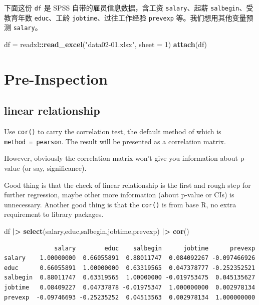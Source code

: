 \documentclass[
]{ctexart}
\newenvironment{Shaded}{\begin{snugshade}}{\end{snugshade}}
\newcommand{\AttributeTok}[1]{\textcolor[rgb]{0.13,0.29,0.53}{#1}}
\newcommand{\DecValTok}[1]{\textcolor[rgb]{0.00,0.00,0.81}{#1}}
\newcommand{\FunctionTok}[1]{\textcolor[rgb]{0.13,0.29,0.53}{\textbf{#1}}}
\newcommand{\NormalTok}[1]{#1}
\newcommand{\OtherTok}[1]{\textcolor[rgb]{0.56,0.35,0.01}{#1}}
\newcommand{\SpecialCharTok}[1]{\textcolor[rgb]{0.81,0.36,0.00}{\textbf{#1}}}
\newcommand{\StringTok}[1]{\textcolor[rgb]{0.31,0.60,0.02}{#1}}
\begin{document}
下面这份 \texttt{df} 是 SPSS 自带的雇员信息数据，含工资
\texttt{salary}、起薪 \texttt{salbegin}、受教育年数 \texttt{educ}、工龄
\texttt{jobtime}、过往工作经验 \texttt{prevexp} 等。我们想用其他变量预测
\texttt{salary}。

\begin{Shaded}
\begin{Highlighting}[]
\NormalTok{df }\OtherTok{=}\NormalTok{ readxl}\SpecialCharTok{::}\FunctionTok{read\_excel}\NormalTok{(}\StringTok{"data02{-}01.xlsx"}\NormalTok{, }\AttributeTok{sheet =} \DecValTok{1}\NormalTok{)}
\FunctionTok{attach}\NormalTok{(df)}
\end{Highlighting}
\end{Shaded}

\hypertarget{pre-inspection}{%
\section{Pre-Inspection}\label{pre-inspection}}

\hypertarget{linear-relationship}{%
\subsection{linear relationship}\label{linear-relationship}}

Use \texttt{cor()} to carry the correlation test, the default method of
which is
\texttt{method\ =\ \textquotesingle{}pearson\textquotesingle{}}. The
result will be presented as a correlation matrix.

However, obviously the correlation matrix won't give you information
about p-value (or say, significance).

Good thing is that the check of linear relationship is the first and
rough step for further regression, maybe other more information (about
p-value or CIs) is unnecessary. Another good thing is that the
\texttt{cor()} is from base R, no extra requirement to library packages.

\begin{Shaded}
\begin{Highlighting}[]
\NormalTok{df }\SpecialCharTok{|\textgreater{}} \FunctionTok{select}\NormalTok{(salary,educ,salbegin,jobtime,prevexp) }\SpecialCharTok{|\textgreater{}} \FunctionTok{cor}\NormalTok{()}
\end{Highlighting}
\end{Shaded}

\begin{verbatim}
              salary        educ    salbegin      jobtime      prevexp
salary    1.00000000  0.66055891  0.88011747  0.084092267 -0.097466926
educ      0.66055891  1.00000000  0.63319565  0.047378777 -0.252352521
salbegin  0.88011747  0.63319565  1.00000000 -0.019753475  0.045135627
jobtime   0.08409227  0.04737878 -0.01975347  1.000000000  0.002978134
prevexp  -0.09746693 -0.25235252  0.04513563  0.002978134  1.000000000
\end{verbatim}
\end{document}
